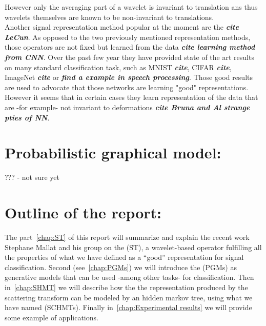 \documentclass[a4paper,11pt]{report}
\begin{document}
			However only the averaging part of a wavelet is invariant to translation ans thus wavelets themselves are known to be non-invariant to translations.\\
			
			Another signal representation method popular at the moment are the  \textbf{\textit{cite LeCun}}. As opposed to the two previously mentioned representation methods, those operators are not fixed but learned from the data \textbf{\textit{cite learning method from CNN}}. Over the past few year they have provided state of the art results on many standard classification task, such as MNIST \textbf{\textit{cite}}, CIFAR \textbf{\textit{cite}}, ImageNet \textbf{\textit{cite }} or \textbf{\textit{find a example in speech processing}}. Those good results are used to advocate that those networks are learning "good" representations. However it seems that in certain cases they learn representation of the data that are -for example- not invariant to deformations \textbf{\textit{cite Bruna and Al strange pties of NN}}.\\
			         
	\section{Probabilistic graphical model:}
		??? - not sure yet
    
	\section{Outline of the report:}
    \label{seq:Intro/Outline of the report}    
		The part~\ref{chap:ST} of this report will summarize and explain the recent work Stephane Mallat and his group on the  (ST), a wavelet-based operator fulfilling all the properties of what we have defined as a ``good'' representation for signal classification. Second (see~\ref{chap:PGMs}) we will introduce the  (PGMs) as generative models that can be used -among other tasks- for classification. Then in~\ref{chap:SHMT} we will describe how the the representation produced by the scattering transform can be modeled by an hidden markov tree, using what we have named  (SCHMTs). Finally in~\ref{chap:Experimental results} we will provide some example of applications.


\end{document}
